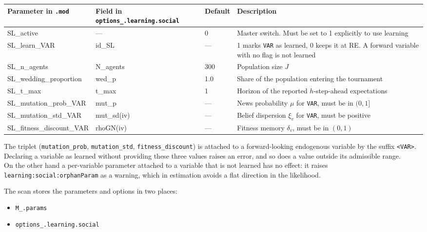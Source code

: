 \documentclass[11pt,a4paper]{article}
\newcommand{\field}[1]{\texttt{#1}}
\newcommand{\file}[1]{\texttt{#1}}
\begin{document}
\begin{longtable}{>{\ttfamily\small}p{5.4cm} >{\ttfamily\small}p{3.4cm} p{1.6cm} p{3.6cm}}
\toprule
\normalfont\textbf{Parameter in \file{.mod}}
    & \normalfont\textbf{Field in \texttt{options\_.\allowbreak learning.social}}
    & \normalfont\textbf{Default}
    & \normalfont\textbf{Description} \\
\midrule
\endhead
SL\_active                & ---        & 0     & Master switch. Must be set to 1 explicitly to use learning\\
SL\_learn\_VAR            & id\_SL     & ---   & 1 marks \texttt{VAR} as learned, 0 keeps it at RE. A forward variable with no flag is not learned \\
SL\_n\_agents             & N\_agents  & 300   & Population size $J$\\
SL\_wedding\_proportion   & wed\_p     & 1.0   & Share of the population entering the tournament \\
SL\_t\_max                & t\_max     & 1     & Horizon of the reported $h$-step-ahead expectations \\
\midrule
SL\_mutation\_prob\_VAR       & mut\_p     & ---  & News probability $\mu$ for \texttt{VAR}, must be in $(0,1]$ \\
SL\_mutation\_std\_VAR    & mut\_sd(iv)   & ---  & Belief dispersion $\xi_v$ for \texttt{VAR}, must be positive \\
SL\_fitness\_discount\_VAR & rhoGN(iv)    & ---  & Fitness memory $\delta_v$, must be in $(0,1)$ \\

\bottomrule
\end{longtable}

\medskip
\noindent
The triplet (\texttt{mutation\_prob}, \texttt{mutation\_std},
\texttt{fitness\_discount}) is attached to a forward-looking endogenous variable
by the suffix \texttt{<VAR>}. Declaring a variable as learned without providing
these three values raises an error, and so does a value outside its admissible
range.\\
On the other hand a per-variable parameter attached to a variable that is not
learned has no effect: it raises \texttt{learning:social:orphanParam} as a
warning, which in estimation avoids a flat direction in the likelihood.

\medskip
\noindent
The scan stores the parameters and options in two places:

\begin{itemize}[leftmargin=2em]
\item \field{M\_.params} 
\item \field{options\_.learning.social}
\end{itemize}
\end{document}
